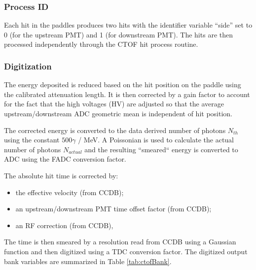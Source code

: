 \subsubsection{Process ID}

Each hit in the paddles produces two hits with the identifier variable ``side'' set to 0 (for the upstream PMT) and 1 (for downstream PMT).
The hits are then processed independently through the CTOF hit process routine.

\subsubsection{Digitization}

The energy deposited is reduced based on the hit position on the paddle using the calibrated attenuation length.
It is then corrected by a gain factor to account for the fact that the high voltages (HV) are adjusted so that
the average upstream/downstream ADC geometric mean is independent of hit position.

The corrected energy is converted to the data derived number of photons $N_{th}$ using the constant $500 \gamma$ / MeV. A Poissonian is used to
calculate the actual number of photons $N_{actual}$ and the resulting ``smeared`` energy is converted to ADC using the FADC conversion factor.


The absolute hit time is corrected by:

\begin{itemize}
	\item the effective velocity (from CCDB);
	\item an upstream/downstream PMT time offset factor (from CCDB);
	\item an RF correction (from CCDB),
\end{itemize}

The time is then smeared by a resolution read from CCDB using a Gaussian function and then digitized using a TDC conversion factor.
The digitized output bank variables are summarized in Table \ref{tab:ctofBank}.

